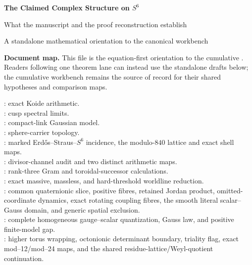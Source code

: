 \documentclass[10pt,letterpaper]{article}
\begin{document}
\ifdefined\SIXOverviewEmbedded
\else
\begin{center}
{\Large\bfseries The Claimed Complex Structure on $S^6$}\par
\vspace{1.5pt}
{\large What the manuscript and the proof reconstruction establish}\par
\vspace{2pt}
{\small A standalone mathematical orientation to the canonical workbench}\par
\end{center}
\vspace{-4pt}
\fi
\fontsize{9.4pt}{10.65pt}\selectfont

\noindent\textbf{Document map.}
This file is the equation-first orientation to the cumulative
.  Readers following one theorem lane can instead use the
standalone drafts below; the cumulative workbench remains the source of record
for their shared hypotheses and comparison maps.
\begin{flushleft}\small
{}: exact Koide arithmetic.\\
: cusp spectral limits.\\
: compact-link Gaussian model.\\
: sphere-carrier topology.\\
: marked Erd\H{o}s--Straus--$S^6$
incidence, the modulo-$840$ lattice and exact shell maps.\\
: divisor-channel audit and two distinct arithmetic maps.\\
: rank-three Gram and toroidal-successor calculations.\\
: exact massive,
massless, and hard-threshold worldline reduction.
\\: common quaternionic slice,
positive fibres, retained Jordan product, omitted-coordinate dynamics,
exact rotating coupling fibres, the smooth literal scalar--Gauss domain,
and generic spatial exclusion.
\\: complete homogeneous
gauge--scalar quantization, Gauss law, and positive finite-model gap.
\\: higher torus wrapping,
octonionic determinant boundary, triality flag, exact mod--12/mod--24 maps,
and the shared residue-lattice/Weyl-quotient continuation.
\end{flushleft}
\end{document}
